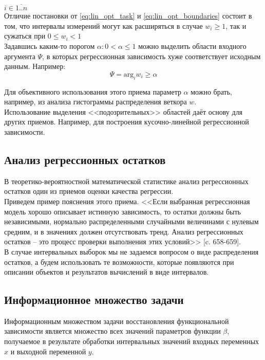 $i \in \overline{1..n}$ \\ 

Отличие постановки от \eqref{eq:lin_opt_task} и \eqref{eq:lin_opt_boundaries} состоит в том, что интервалы измерений могут как расширяться в случае $w_i \geq 1$, так и сужаться при $0 \leq w_i < 1$ \\

Задавшись каким-то порогом $\alpha : 0<\alpha \leq 1$ можно выделить области входного аргумента $\Psi$, в которых регрессионная зависимость хуже соответствует исходным данным. Например: 
\begin{equation}
	\Psi = \text{arg}_i w_i \geq \alpha
\end{equation}

Для объективного использования этого приема параметр $\alpha$ можно брать, например, из анализа гистограммы распределения веткора $w$. \\
Использование выделения <<подозрительных>> областей даёт основу для других приемов. Например, для построения кусочно-линейной регрессионной зависимости. 

\subsection{Анализ регрессионных остатков} 

В теоретико-вероятностной математической статистике анализ регрессионных остатков один из приемов оценки качества регрессии. \\
Приведем пример пояснения этого приема. <<Если выбранная регрессионная модель хорошо описывает истинную зависимость, то остатки должны быть независимыми, нормально распределенными случайными величинами с нулевым средним, и в значениях должен отсутствовать тренд. Анализ регрессионных остатков -- это процесс проверки выполнения этих условий>> \cite{s:remains}[c. 658-659]. \\
В случае интервальных выборок мы не задаемся вопросом о виде распределения остатков, а будем использовать те возможности, которые появляются при описании объектов и результатов вычислений в виде интервалов. 

\subsection{Информационное множество задачи}

Информационным множеством задачи восстановления функциональной зависимости является множество всех значений параметров функции $\beta$, получаемое в результате обработки интервальных значений входных переменных $x$ и выходной переменной $y$. \\

